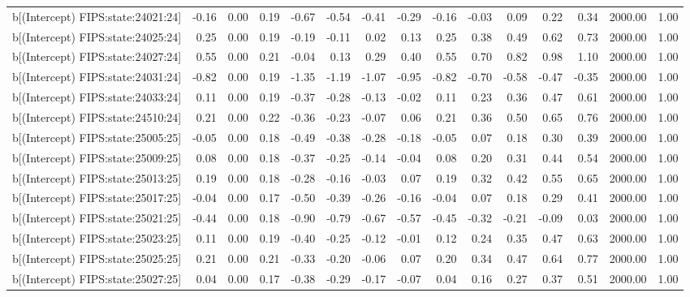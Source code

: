 \begin{table}[ht]
\begin{tabular}{rrrrrrrrrrrrrrr}
  b[(Intercept) FIPS:state:24021:24] & -0.16 & 0.00 & 0.19 & -0.67 & -0.54 & -0.41 & -0.29 & -0.16 & -0.03 & 0.09 & 0.22 & 0.34 & 2000.00 & 1.00 \\ 
  b[(Intercept) FIPS:state:24025:24] & 0.25 & 0.00 & 0.19 & -0.19 & -0.11 & 0.02 & 0.13 & 0.25 & 0.38 & 0.49 & 0.62 & 0.73 & 2000.00 & 1.00 \\ 
  b[(Intercept) FIPS:state:24027:24] & 0.55 & 0.00 & 0.21 & -0.04 & 0.13 & 0.29 & 0.40 & 0.55 & 0.70 & 0.82 & 0.98 & 1.10 & 2000.00 & 1.00 \\ 
  b[(Intercept) FIPS:state:24031:24] & -0.82 & 0.00 & 0.19 & -1.35 & -1.19 & -1.07 & -0.95 & -0.82 & -0.70 & -0.58 & -0.47 & -0.35 & 2000.00 & 1.00 \\ 
  b[(Intercept) FIPS:state:24033:24] & 0.11 & 0.00 & 0.19 & -0.37 & -0.28 & -0.13 & -0.02 & 0.11 & 0.23 & 0.36 & 0.47 & 0.61 & 2000.00 & 1.00 \\ 
  b[(Intercept) FIPS:state:24510:24] & 0.21 & 0.00 & 0.22 & -0.36 & -0.23 & -0.07 & 0.06 & 0.21 & 0.36 & 0.50 & 0.65 & 0.76 & 2000.00 & 1.00 \\ 
  b[(Intercept) FIPS:state:25005:25] & -0.05 & 0.00 & 0.18 & -0.49 & -0.38 & -0.28 & -0.18 & -0.05 & 0.07 & 0.18 & 0.30 & 0.39 & 2000.00 & 1.00 \\ 
  b[(Intercept) FIPS:state:25009:25] & 0.08 & 0.00 & 0.18 & -0.37 & -0.25 & -0.14 & -0.04 & 0.08 & 0.20 & 0.31 & 0.44 & 0.54 & 2000.00 & 1.00 \\ 
  b[(Intercept) FIPS:state:25013:25] & 0.19 & 0.00 & 0.18 & -0.28 & -0.16 & -0.03 & 0.07 & 0.19 & 0.32 & 0.42 & 0.55 & 0.65 & 2000.00 & 1.00 \\ 
  b[(Intercept) FIPS:state:25017:25] & -0.04 & 0.00 & 0.17 & -0.50 & -0.39 & -0.26 & -0.16 & -0.04 & 0.07 & 0.18 & 0.29 & 0.41 & 2000.00 & 1.00 \\ 
  b[(Intercept) FIPS:state:25021:25] & -0.44 & 0.00 & 0.18 & -0.90 & -0.79 & -0.67 & -0.57 & -0.45 & -0.32 & -0.21 & -0.09 & 0.03 & 2000.00 & 1.00 \\ 
  b[(Intercept) FIPS:state:25023:25] & 0.11 & 0.00 & 0.19 & -0.40 & -0.25 & -0.12 & -0.01 & 0.12 & 0.24 & 0.35 & 0.47 & 0.63 & 2000.00 & 1.00 \\ 
  b[(Intercept) FIPS:state:25025:25] & 0.21 & 0.00 & 0.21 & -0.33 & -0.20 & -0.06 & 0.07 & 0.20 & 0.34 & 0.47 & 0.64 & 0.77 & 2000.00 & 1.00 \\ 
  b[(Intercept) FIPS:state:25027:25] & 0.04 & 0.00 & 0.17 & -0.38 & -0.29 & -0.17 & -0.07 & 0.04 & 0.16 & 0.27 & 0.37 & 0.51 & 2000.00 & 1.00 \\ 

\end{tabular}
\end{table}
